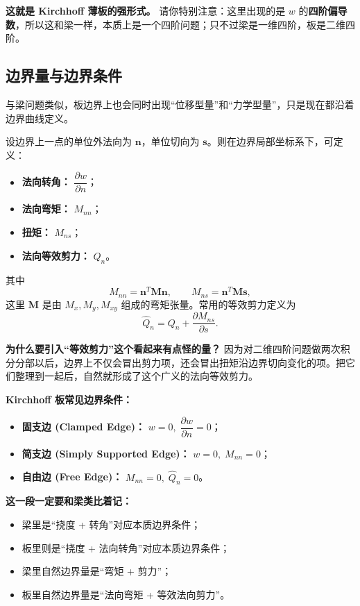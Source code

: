 \documentclass[11pt, a4paper, UTF8]{ctexart}
\begin{document}
\textbf{这就是 Kirchhoff 薄板的强形式。}
请你特别注意：这里出现的是 $w$ 的\textbf{四阶偏导数}，所以这和梁一样，本质上是一个四阶问题；只不过梁是一维四阶，板是二维四阶。

\subsection{边界量与边界条件}
与梁问题类似，板边界上也会同时出现“位移型量”和“力学型量”，只是现在都沿着边界曲线定义。

设边界上一点的单位外法向为 $\bm{n}$，单位切向为 $\bm{s}$。则在边界局部坐标系下，可定义：
\begin{itemize}
    \item \textbf{法向转角：} $\dfrac{\partial w}{\partial n}$；
    \item \textbf{法向弯矩：} $M_{nn}$；
    \item \textbf{扭矩：} $M_{ns}$；
    \item \textbf{法向等效剪力：} $\widehat{Q}_n$。
\end{itemize}

其中
\[
M_{nn} = \bm{n}^T \bm{M}\bm{n},
\qquad
M_{ns} = \bm{n}^T \bm{M}\bm{s},
\]
这里 $\bm{M}$ 是由 $M_x,M_y,M_{xy}$ 组成的弯矩张量。常用的等效剪力定义为
\[
\widehat{Q}_n = Q_n + \frac{\partial M_{ns}}{\partial s}.
\]

\textbf{为什么要引入“等效剪力”这个看起来有点怪的量？}
因为对二维四阶问题做两次积分分部以后，边界上不仅会冒出剪力项，还会冒出扭矩沿边界切向变化的项。把它们整理到一起后，自然就形成了这个广义的法向等效剪力。

\textbf{Kirchhoff 板常见边界条件：}
\begin{itemize}
    \item \textbf{固支边 (Clamped Edge)：} $w=0,\; \dfrac{\partial w}{\partial n}=0$；
    \item \textbf{简支边 (Simply Supported Edge)：} $w=0,\; M_{nn}=0$；
    \item \textbf{自由边 (Free Edge)：} $M_{nn}=0,\; \widehat{Q}_n=0$。
\end{itemize}

\textbf{这一段一定要和梁类比着记：}
\begin{itemize}
    \item 梁里是“挠度 + 转角”对应本质边界条件；
    \item 板里则是“挠度 + 法向转角”对应本质边界条件；
    \item 梁里自然边界量是“弯矩 + 剪力”；
    \item 板里自然边界量是“法向弯矩 + 等效法向剪力”。
\end{itemize}
\end{document}
